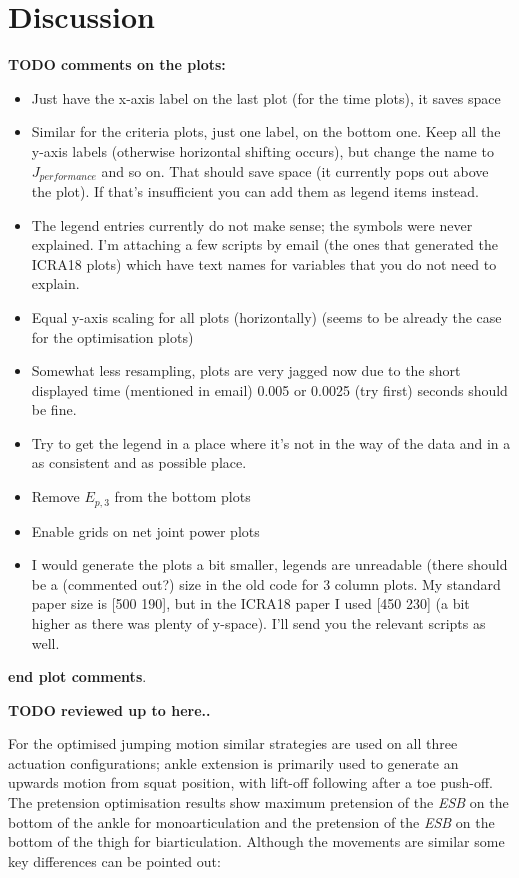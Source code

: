 \documentclass[letterpaper, 10 pt, conference]{ieeeconf}  %
\begin{document}
\section{Discussion} \label{sec:discussion}
\textbf{TODO comments on the plots:}
\begin{itemize}
	\item Just have the x-axis label on the last plot (for the time plots), it saves space
	\item Similar for the criteria plots, just one label, on the bottom one. Keep all the y-axis labels (otherwise horizontal shifting occurs), but change the name to $J_{performance}$ and so on. That should save space (it currently pops out above the plot). If that's insufficient you can add them as legend items instead.
	\item The legend entries currently do not make sense; the symbols were never explained. I'm attaching a few scripts by email (the ones that generated the ICRA18 plots) which have text names for variables that you do not need to explain.
	\item Equal y-axis scaling for all plots (horizontally) (seems to be already the case for the optimisation plots)
	\item Somewhat less resampling, plots are very jagged now due to the short displayed time (mentioned in email) 0.005 or 0.0025 (try first) seconds should be fine.
	\item Try to get the legend in a place where it's not in the way of the data and in a as consistent and as possible place.
	\item Remove $E_{p,3}$ from the bottom plots
	\item Enable grids on net joint power plots
	\item I would generate the plots a bit smaller, legends are unreadable (there should be a (commented out?) size in the old code for 3 column plots. My standard paper size is [500 190], but in the ICRA18 paper I used [450 230] (a bit higher as there was plenty of y-space). I'll send you the relevant scripts as well.
\end{itemize}
\textbf{end plot comments}.

\textbf{TODO reviewed up to here..}

For the optimised jumping motion similar strategies are used on all three actuation configurations; ankle extension is primarily used to generate an upwards motion from squat position, with lift-off following after a toe push-off. The pretension optimisation results show maximum pretension of the \textit{ESB} on the bottom of the ankle for monoarticulation and the pretension of the \textit{ESB} on the bottom of the thigh for biarticulation. Although the movements are similar some key differences can be pointed out:
\end{document}
